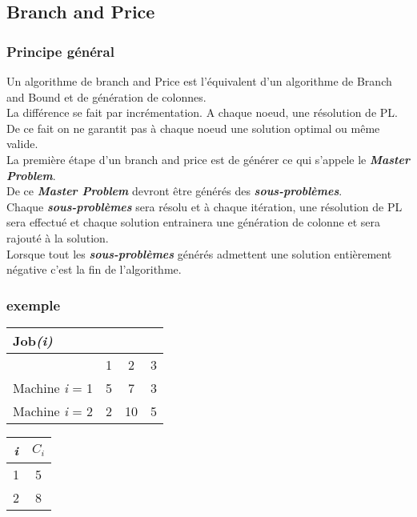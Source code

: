 


\subsection{Branch and Price}
\subsubsection{Principe général}
Un algorithme de branch and Price est l'équivalent d'un algorithme de Branch and Bound et de génération de colonnes. \\
La différence se fait par incrémentation. A chaque noeud, une résolution de PL. De ce fait on ne garantit pas à chaque noeud une solution optimal ou même valide. 
\\
La première étape d'un branch and price est de générer ce qui s'appele le \textbf{\textit{Master Problem}}.\\
De ce \textbf{\textit{Master Problem}} devront être générés des \textbf{\textit{sous-problèmes}}. \\
Chaque \textbf{\textit{sous-problèmes}} sera résolu et à chaque itération, une résolution de PL sera effectué et chaque solution entrainera une génération de colonne et sera rajouté à la solution. \\
Lorsque tout les \textbf{\textit{sous-problèmes}} générés admettent une solution entièrement négative c'est la fin de l'algorithme.


\subsubsection{exemple}

\begin{tabular}{  p{2.5cm} c c c}
\hline
\textbf{Job}\textit{(i)} \\
\hline
 & 1 & 2 & 3 \\
 \hline
Machine \textit{i} = 1 & 5 & 7 & 3 \\
Machine \textit{i} = 2 & 2 & 10 & 5 \\
\hline
\end{tabular}

\vspace{1cm}

\begin{tabular}{c c}
\hline
\textit{i} & $C_\textit{i}$\\
\hline
1 & 5 \\
\hline
2 & 8\\
\hline
\end{tabular}

